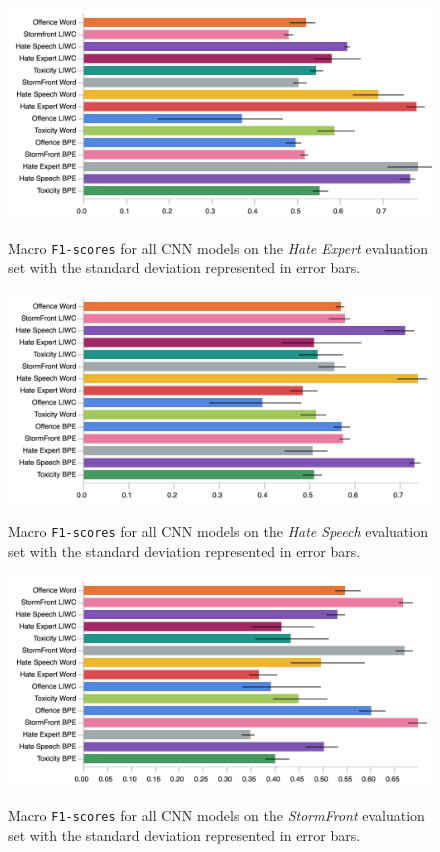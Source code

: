 \begin{figure}
\begin{minipage}{\textwidth}
\centering
    \includegraphics[width=\textwidth]{all_cnn_waseem_test.pdf}
    \caption{Macro \texttt{F1-scores} for all CNN models on the \textit{Hate Expert} evaluation set with the standard deviation represented in error bars.}
    \label{fig:waseem_cnn_test}
    \vfill
    \includegraphics[width=\textwidth]{all_cnn_waseem_hovy_test.pdf}
    \caption{Macro \texttt{F1-scores} for all CNN models on the \textit{Hate Speech} evaluation set with the standard deviation represented in error bars.}
  \label{fig:waseem_hovy_cnn_test}
    \includegraphics[width=\textwidth]{all_cnn_garcia_test.pdf}
  \caption{Macro \texttt{F1-scores} for all CNN models on the \textit{StormFront} evaluation set with the standard deviation represented in error bars.}
  \label{fig:garcia_cnn_test}
\end{minipage}
\end{figure}

